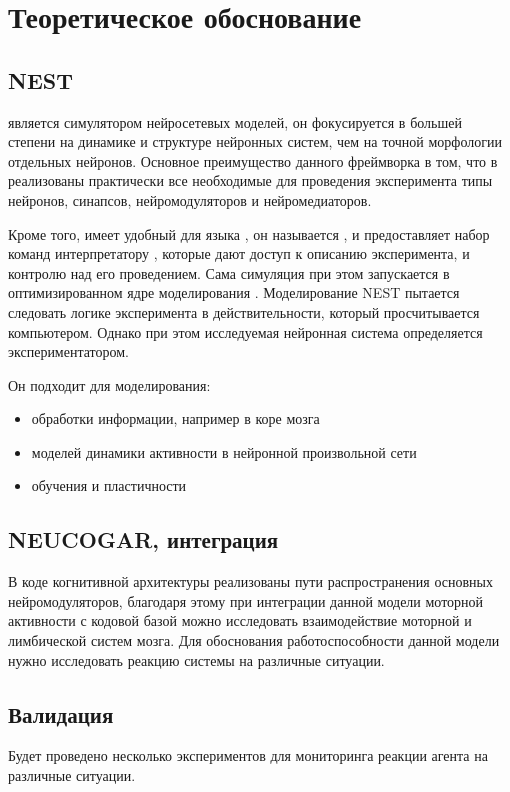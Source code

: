 \chapter{Теоретическое обоснование}
\label{chap:theoretical_development}
\section{NEST}
 является симулятором нейросетевых моделей, он фокусируется в большей степени на динамике и структуре нейронных систем, чем на точной морфологии отдельных нейронов. 
Основное преимущество данного фреймворка в том, что в  реализованы практически все необходимые для проведения эксперимента типы нейронов, синапсов, нейромодуляторов и нейромедиаторов. 

Кроме того,  имеет удобный  для языка , он называется , и предоставляет набор команд интерпретатору , которые дают доступ к описанию эксперимента, и контролю над его проведением. 
Сама симуляция при этом запускается в оптимизированном ядре моделирования .
Моделирование NEST пытается следовать логике эксперимента в действительности, который просчитывается компьютером. Однако при этом исследуемая нейронная система определяется экспериментатором.

Он подходит для моделирования:
\begin{itemize}
	\item обработки информации, например в коре мозга
	\item моделей динамики активности в нейронной произвольной сети
	\item обучения и пластичности
\end{itemize}

\section{NEUCOGAR, интеграция}
В коде когнитивной архитектуры  реализованы пути распространения основных нейромодуляторов, благодаря этому при интеграции данной модели моторной активности с кодовой базой  можно исследовать взаимодействие моторной и лимбической систем мозга. 
Для обоснования работоспособности данной модели нужно исследовать реакцию системы на различные ситуации. 


\section{Валидация}
\label{section:validation}
Будет проведено несколько экспериментов для мониторинга реакции агента на различные ситуации.

